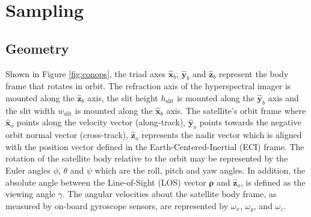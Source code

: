
\section{Sampling} \label{sec:sampling}
\subsection{Geometry}
Shown in Figure \ref{fig:conops}, 
the triad axes $\hat{\mathbf{x}}_b$, $\hat{\mathbf{y}}_b$ and $\hat{\mathbf{z}}_b$ represent the body frame that rotates in orbit. The refraction axis of the hyperspectral imager  is mounted along the $\hat{\mathbf{z}}_b$ axis, the slit height $h_\text{slit}$ is mounted along the $\hat{\mathbf{y}}_b$ axis and the slit width $w_\text{slit}$ is mounted along the $\hat{\mathbf{x}}_b$ axis. The satellite's orbit frame where $\hat{\mathbf{x}}_o$ points along the velocity vector (along-track), $\hat{\mathbf{y}}_o$ points towards the negative orbit normal vector (cross-track), $\hat{\mathbf{z}}_o$ represents the nadir vector which is aligned with the position vector defined in the Earth-Centered-Inertial (ECI) frame. 
The rotation of the satellite body relative to the orbit may be represented by the Euler angles $\phi$, $\theta$ and $\psi$ which are the roll, pitch and yaw angles. In addition, the absolute angle between the Line-of-Sight (LOS) vector $\boldsymbol{\rho}$ and $\hat{\mathbf{z}}_o$, is defined as the viewing angle $\gamma$.
% 
The angular velocities about the satellite body frame, as measured by on-board gyroscope sensors, are represented by $\omega_x$, $\omega_y$, and $\omega_z$. 

